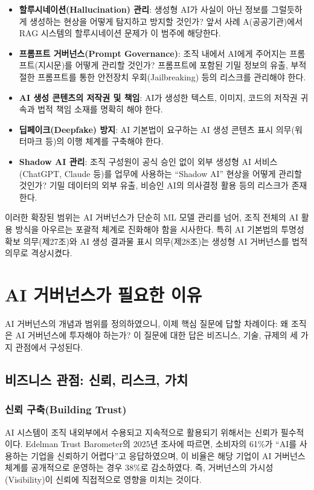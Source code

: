 \begin{itemize}
    \item \textbf{할루시네이션(Hallucination) 관리}: 생성형 AI가 사실이 아닌 정보를 그럴듯하게 생성하는 현상을 어떻게 탐지하고 방지할 것인가? 앞서 사례 A(공공기관)에서 RAG 시스템의 할루시네이션 문제가 이 범주에 해당한다.
    \item \textbf{프롬프트 거버넌스(Prompt Governance)}: 조직 내에서 AI에게 주어지는 프롬프트(지시문)를 어떻게 관리할 것인가? 프롬프트에 포함된 기밀 정보의 유출, 부적절한 프롬프트를 통한 안전장치 우회(Jailbreaking) 등의 리스크를 관리해야 한다.
    \item \textbf{AI 생성 콘텐츠의 저작권 및 책임}: AI가 생성한 텍스트, 이미지, 코드의 저작권 귀속과 법적 책임 소재를 명확히 해야 한다.
    \item \textbf{딥페이크(Deepfake) 방지}: AI 기본법이 요구하는 AI 생성 콘텐츠 표시 의무(워터마크 등)의 이행 체계를 구축해야 한다.
    \item \textbf{Shadow AI 관리}: 조직 구성원이 공식 승인 없이 외부 생성형 AI 서비스(ChatGPT, Claude 등)를 업무에 사용하는 ``Shadow AI'' 현상을 어떻게 관리할 것인가? 기밀 데이터의 외부 유출, 비승인 AI의 의사결정 활용 등의 리스크가 존재한다.
\end{itemize}

이러한 확장된 범위는 AI 거버넌스가 단순히 ML 모델 관리를 넘어, 조직 전체의 AI 활용 방식을 아우르는 포괄적 체계로 진화해야 함을 시사한다. 특히 AI 기본법의 투명성 확보 의무(제27조)와 AI 생성 결과물 표시 의무(제28조)는 생성형 AI 거버넌스를 법적 의무로 격상시켰다.

\section{AI 거버넌스가 필요한 이유}
AI 거버넌스의 개념과 범위를 정의하였으니, 이제 핵심 질문에 답할 차례이다: 왜 조직은 AI 거버넌스에 투자해야 하는가?\cite{dafoe2018aigovernance} 이 질문에 대한 답은 비즈니스, 기술, 규제의 세 가지 관점에서 구성된다.

\subsection{비즈니스 관점: 신뢰, 리스크, 가치}
\subsubsection*{신뢰 구축(Building Trust)}
AI 시스템이 조직 내외부에서 수용되고 지속적으로 활용되기 위해서는 신뢰가 필수적이다. Edelman Trust Barometer의 2025년 조사에 따르면, 소비자의 61\%가 ``AI를 사용하는 기업을 신뢰하기 어렵다''고 응답하였으며, 이 비율은 해당 기업이 AI 거버넌스 체계를 공개적으로 운영하는 경우 38\%로 감소하였다. 즉, 거버넌스의 가시성(Visibility)이 신뢰에 직접적으로 영향을 미치는 것이다.

